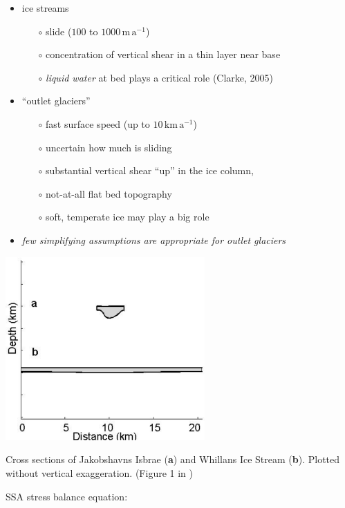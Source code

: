 \documentclass[titlepage,letterpaper,final,12pt]{scrartcl}
\newcommand{\alert}[1]{\emph{#1}}
\begin{document}
\begin{itemize}
\item ice streams 
  \begin{itemize}
  \item[$\circ$] slide ($100$ to $1000 \,\text{m}\,\text{a}^{-1}$)
  \item[$\circ$] concentration of vertical shear in a thin layer near base
  \item[$\circ$] \emph{liquid water} at bed plays a critical role (Clarke, 2005)\nocite{Clarke05}
  \end{itemize}
\item ``outlet glaciers''
  \begin{itemize}
  \item[$\circ$] fast surface speed (up to $10 \,\text{km}\,\text{a}^{-1}$)
  \item[$\circ$] uncertain how much is sliding
  \item[$\circ$] substantial vertical shear ``up'' in the ice column,
  \item[$\circ$] not-at-all flat bed topography
  \item[$\circ$] soft, temperate ice may play a big role
  \end{itemize} 
\item \alert{few simplifying assumptions are appropriate for outlet glaciers}
\end{itemize}

\begin{center}
\includegraphics[width=3.0in]{streamisbrae}

Cross sections of Jakobshavns Isbrae (\textbf{a}) and Whillans Ice Stream (\textbf{b}).  Plotted without vertical exaggeration.  (Figure 1 in \cite{TrufferEchelmeyer})
\end{center}

SSA stress balance equation:
\end{document}
